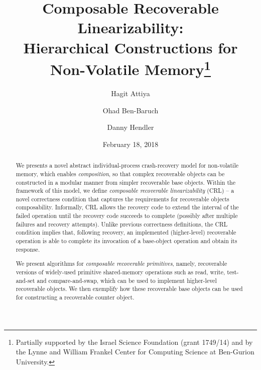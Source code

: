 \begin{titlepage}
	
	\title{Composable Recoverable Linearizability:\\
            Hierarchical Constructions for Non-Volatile Memory\thanks{
		Partially supported by the Israel Science Foundation
		(grant 1749/14) and by the Lynne and William Frankel Center for Computing Science at Ben-Gurion University.}}
	
	
	\author[1]{Hagit Attiya}
	\author[2]{Ohad Ben-Baruch}
	\author[3]{Danny Hendler}
	
    \date{February 18, 2018}
	\maketitle

\begin{abstract}
We presents a novel abstract individual-process crash-recovery model for non-volatile memory, which enables \emph{composition}, so that complex recoverable objects can be constructed in a modular manner from simpler recoverable base objects. Within the framework of this model, we define \emph{composable recoverable linearizability} (CRL) -- a novel correctness condition that captures the requirements for recoverable objects composability. Informally, CRL allows the recovery code to extend the interval of the failed operation until the recovery code succeeds to complete
(possibly after multiple failures and recovery attempts).
Unlike previous correctness definitions, the CRL condition implies that,
following recovery, an implemented (higher-level) recoverable operation
is able to complete its invocation of a base-object operation and obtain its response.

We present algorithms for \emph{composable recoverable primitives},
namely, recoverable versions of widely-used primitive shared-memory
operations such as read, write, test-and-set and compare-and-swap,
which can be used to implement higher-level recoverable objects. We then  
exemplify how these recoverable base objects can be used for constructing a 
recoverable counter object. 


\end{abstract}
\end{titlepage}
